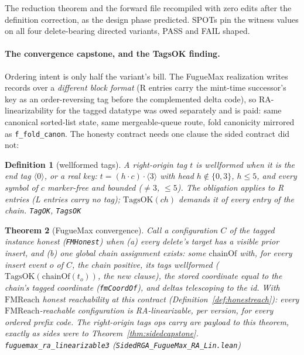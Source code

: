 \documentclass[11pt]{article}
\newtheorem{theorem}{Theorem}[section]
\newtheorem{definition}[theorem]{Definition}
\newcommand{\lean}[1]{\texttt{#1}}
\newcommand{\code}[1]{\texttt{#1}}
\begin{document}
\noindent The reduction theorem and the forward file recompiled with
zero edits after the definition correction, as the design phase
predicted. SPOTs pin the witness values on all four delete-bearing
directed variants, PASS and FAIL shaped.

\paragraph{The convergence capstone, and the TagsOK finding.} Ordering
intent is only half the variant's bill. The FugueMax realization writes
records over a \emph{different block format} (R entries carry the
mint-time successor's key as an order-reversing tag before the
complemented delta code), so RA-linearizability for the tagged datatype
was owed separately and is paid: same canonical sorted-list state,
same mergeable-queue route, fold canonicity mirrored as
\lean{f\_fold\_canon}. The honesty contract needs one clause the sided
contract did not:

\begin{definition}[wellformed tags]
\label{def:tagsok}
A right-origin tag $t$ is \emph{wellformed} when it is the end tag
$\langle 0 \rangle$, or a real key: $t = (h \cdot c) \cdot \langle 3
\rangle$ with head $h \notin \{0, 3\}$, $h \le 5$, and every symbol
of $c$ marker-free and bounded ($\ne 3$, $\le 5$). The obligation
applies to R entries (L entries carry no tag);
$\mathrm{TagsOK}(ch)$ demands it of every entry of the chain.
\hfill\lean{TagOK}, \lean{TagsOK}
\end{definition}

\begin{theorem}[FugueMax convergence]
\label{thm:fmralin}
Call a configuration $C$ of the tagged instance \emph{honest}
(\lean{FMHonest}) when (a) every delete's target has a visible prior
insert, and (b) one global chain assignment exists: some
$\mathrm{chainOf}$ with, for every insert event $o$ of $C$, the chain
positive, its tags wellformed
($\mathrm{TagsOK}(\mathrm{chainOf}(t_o))$, the new clause), the
stored coordinate equal to the chain's tagged coordinate
(\lean{fmCoordOf}), and deltas telescoping to the id. With
$\mathrm{FMReach}$ honest reachability at this contract
(Definition~\ref{def:honestreach}): every
$\mathrm{FMReach}$-reachable configuration is RA-linearizable, per
version, for every ordered prefix code. The right-origin tags ops
carry are payload to this theorem, exactly as sides were to
Theorem~\ref{thm:sidedcapstone}.
\hfill\lean{fuguemax\_ra\_linearizable3}
(\code{SidedRGA\_FugueMax\_RA\_Lin.lean})
\end{theorem}
\end{document}
